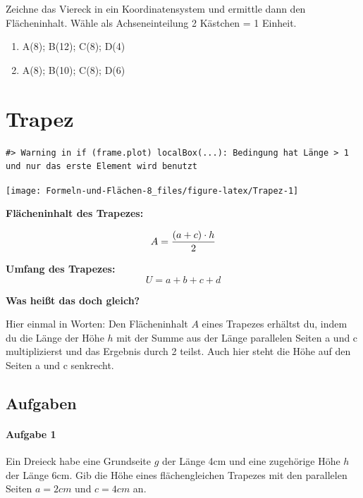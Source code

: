 \documentclass[
  ngerman,
]{book}
\begin{document}
Zeichne das Viereck in ein Koordinatensystem und ermittle dann den Flächeninhalt. Wähle als Achseneinteilung 2 Kästchen = 1 Einheit.

\begin{enumerate}
\def\labelenumi{\alph{enumi})}
\item
  A(8); B(12); C(8); D(4)
\item
  A(8); B(10); C(8); D(6)
\end{enumerate}

\hypertarget{trapez}{%
\chapter{Trapez}\label{trapez}}

\begin{verbatim}
#> Warning in if (frame.plot) localBox(...): Bedingung hat Länge > 1 und nur das erste Element wird benutzt
\end{verbatim}

\begin{center}\texttt{[image: Formeln-und-Flächen-8\_files/figure-latex/Trapez-1]} \end{center}

\textbf{Flächeninhalt des Trapezes:}

\[A = {(a+c) \cdot h \over 2}\]

\textbf{Umfang des Trapezes:}
\[U = a + b + c + d\]

\textbf{Was heißt das doch gleich?}

Hier einmal in Worten: Den Flächeninhalt \(A\) eines Trapezes erhältst du, indem du die Länge der Höhe \(h\) mit der Summe aus der Länge parallelen Seiten a und c multiplizierst und das Ergebnis durch 2 teilst. Auch hier steht die Höhe auf den Seiten a und c senkrecht.

\hypertarget{aufgaben-3}{%
\section*{Aufgaben}\label{aufgaben-3}}

\hypertarget{aufgabe-1-3}{%
\subsubsection*{Aufgabe 1}\label{aufgabe-1-3}}

Ein Dreieck habe eine Grundseite \(g\) der Länge 4cm und eine zugehörige Höhe \(h\) der Länge 6cm.
Gib die Höhe eines flächengleichen Trapezes mit den parallelen Seiten \(a = 2cm\) und \(c = 4cm\) an.
\end{document}
